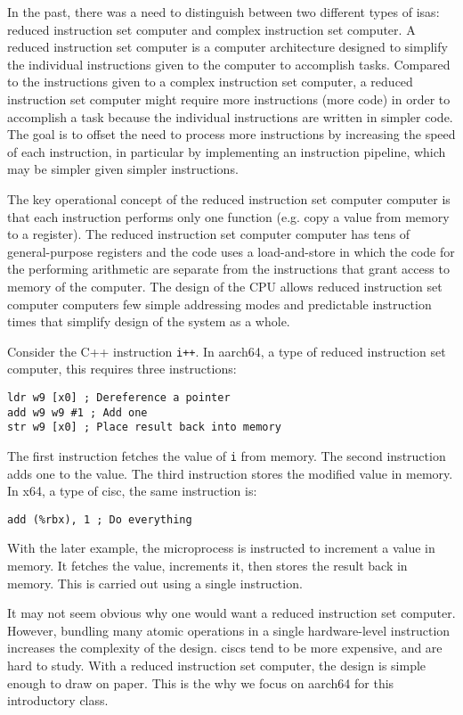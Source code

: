 \documentclass[letterpaper, 12pt]{book}
\begin{document}
In the past, there was a need to distinguish between two different types of \glspl{isa}: \gls{reduced instruction set computer} and  
\gls{complex instruction set computer}. A \gls{reduced instruction set computer} is a computer 
architecture designed %
to simplify the individual instructions given to the computer to accomplish tasks. Compared to the 
instructions given to a \gls{complex instruction set computer}, a \gls{reduced instruction set computer} might require more 
instructions (more code) in order to accomplish a task because the individual instructions are written 
in simpler code. The goal is to offset the need to process more instructions by increasing the speed 
of each instruction, in particular by implementing an instruction pipeline, which may be simpler given 
simpler instructions.

The key operational concept of the \gls{reduced instruction set computer} computer is that each instruction performs only one function 
(e.g. copy a value from memory to a register). The \gls{reduced instruction set computer} computer has tens of general-purpose 
\glspl{register} and the code uses a \gls{load-and-store} in which the code for the performing
arithmetic are separate from the instructions that grant access to memory of the computer. 
The design of the CPU allows \gls{reduced instruction set computer} computers few simple addressing modes and predictable instruction times 
that simplify design of the system as a whole.

Consider the C++ instruction \texttt{i++}. In \gls{aarch64}, a type of \gls{reduced instruction set computer}, 
this requires three instructions:
%
\begin{verbatim}
ldr w9 [x0] ; Dereference a pointer
add w9 w9 #1 ; Add one
str w9 [x0] ; Place result back into memory
\end{verbatim}
%
The first instruction fetches the value of \texttt{i} from memory. The second instruction adds one to 
the value. The third instruction stores the modified value in memory. In \gls{x64}, a type of \gls{cisc},
the same instruction is:
\begin{verbatim}
add (%rbx), 1 ; Do everything
\end{verbatim}
%
With the later example, the microprocess is instructed to increment a value in memory. It fetches the 
value, increments it, then stores the result back in memory. This is carried out using a single instruction.

It may not seem obvious why one would want a \gls{reduced instruction set computer}. However, bundling many 
atomic operations in a single hardware-level instruction increases the complexity of the design. \glspl{cisc}
tend to be more expensive, and are hard to study. With a \gls{reduced instruction set computer}, the design 
is simple enough to draw on paper. This is the why we focus on \gls{aarch64} for this introductory class.
\end{document}
